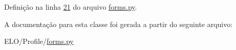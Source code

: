 Definição na linha \hyperlink{Profile_2forms_8py_source_l00021}{21} do arquivo \hyperlink{Profile_2forms_8py_source}{forms.\-py}.



A documentação para esta classe foi gerada a partir do seguinte arquivo\-:\begin{DoxyCompactItemize}
\item 
E\-L\-O/\-Profile/\hyperlink{Profile_2forms_8py}{forms.\-py}\end{DoxyCompactItemize}
